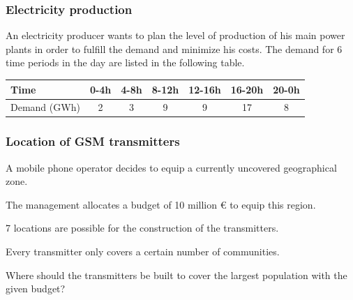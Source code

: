 \documentclass[9pt,handout]{beamer}
\begin{document}
%
\begin{frame}
\frametitle{Electricity production}
An electricity producer wants to \alert{plan the level of production} of
his main power plants in order to \alert{fulfill the demand} and \alert{minimize his costs}.
The demand for 6 time periods in the day are listed in the following table.
\begin{center}
\begin{tabular}{l|cccccc}
Time & 0-4h & 4-8h & 8-12h & 12-16h & 16-20h & 20-0h\\
\hline
Demand (GWh) & 2 & 3 & 9 & 9 & 17 & 8
\end{tabular}
\end{center}
\end{frame}
\begin{frame}
\frametitle{Location of GSM transmitters}
A mobile phone operator decides to equip a currently \alert{uncovered geographical zone}. \bigskip

\noindent
The management allocates a \alert{budget of 10 million \euro}  to equip this region.\bigskip

\noindent
\alert{7 locations} are possible for the construction of the transmitters.\bigskip

\noindent
Every transmitter only covers \alert{a certain number of communities}.\bigskip

\noindent
Where should the transmitters be built \alert{to cover the largest population} with the given budget?
\end{frame}
\end{document}
